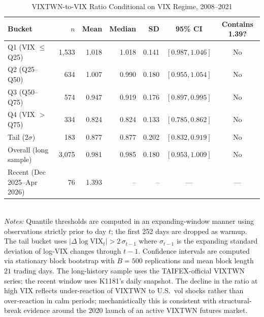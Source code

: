 \begin{table}[!htbp]
\centering
\caption{VIXTWN-to-VIX Ratio Conditional on VIX Regime, 2008--2021}
\label{tab:ratio_linearity}
\small
\begin{tabular}{lrrrrcc}
\toprule
Bucket & $n$ & Mean & Median & SD & 95\% CI & Contains 1.39? \\
\midrule
Q1 (VIX $\le$ Q25) & 1{,}533 & 1.018 & 1.018 & 0.141 & $[0.987, 1.046]$ & No \\
Q2 (Q25--Q50)      &   634 & 1.007 & 0.990 & 0.180 & $[0.955, 1.054]$ & No \\
Q3 (Q50--Q75)      &   574 & 0.947 & 0.919 & 0.176 & $[0.897, 0.995]$ & No \\
Q4 (VIX $>$ Q75)   &   334 & 0.824 & 0.824 & 0.133 & $[0.785, 0.862]$ & No \\
Tail ($2\sigma$)   &   183 & 0.877 & 0.877 & 0.202 & $[0.832, 0.919]$ & No \\
\midrule
Overall (long sample) & 3{,}075 & 0.981 & 0.985 & 0.180 & $[0.953, 1.009]$ & No \\
Recent (Dec 2025--Apr 2026) &  76 & 1.393 &     -- &     -- & --- & --- \\
\bottomrule
\end{tabular}
\smallskip
\\
\small \textit{Notes:} Quantile thresholds are computed in an
expanding-window manner using observations strictly prior to day $t$;
the first 252 days are dropped as warmup. The tail bucket uses
$|\Delta \log \text{VIX}_t| > 2\,\sigma_{t-1}$ where $\sigma_{t-1}$ is the
expanding standard deviation of log-VIX changes through $t-1$. Confidence
intervals are computed via stationary block bootstrap
\citep{politis1994stationary} with $B=500$ replications and mean block
length $21$ trading days. The long-history sample uses the TAIFEX-official
VIXTWN series; the recent window uses K1181's daily snapshot. The decline
in the ratio at high VIX reflects under-reaction of VIXTWN to U.S.\
vol shocks rather than over-reaction in calm periods; mechanistically
this is consistent with structural-break evidence around the 2020 launch
of an active VIXTWN futures market.
\end{table}

